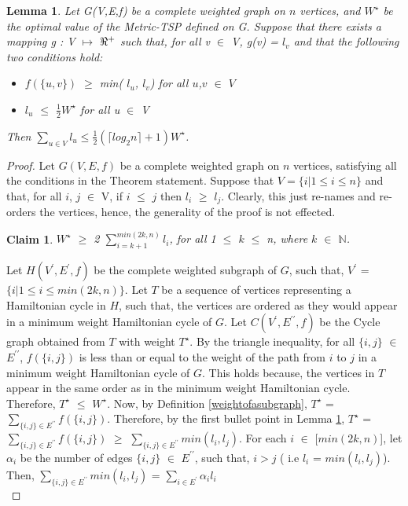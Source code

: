 \documentclass[12pt]{article}
\newtheorem{lemma}[definition]{Lemma}
\newtheorem{claim}{Claim}
\numberwithin{equation}{subsection}
\numberwithin{table}{subsection}
\numberwithin{algorithm}{subsection}
\numberwithin{figure}{subsection}
\begin{document}
\begin{lemma}
\label{to_proove_bound}
Let G(V,E,f) be a complete weighted graph on $n$ vertices, and $W^\star$ be the optimal value of the Metric-TSP defined on G. Suppose that there exists a mapping g : V $\mapsto$ $\real^+$ such that, for all v $\in$ V, g(v) = $l_v$ and that the following  two conditions hold:
\begin{itemize}
\item $f(\{u, v\})$ $\geq$ min( $l_u$, $l_v$) for all $u$,$v$ $\in$ $V$
\item $l_u$ $\leq$ $\frac{1}{2}W^\star$ for all u $\in$ V
\end{itemize}
Then $\sum_{u \in V} l_u \leq \frac{1}{2}(\lceil log_2 n \rceil + 1)W^\star$. {}
\end{lemma}
\begin{proof}
Let $G(V,E,f)$ be a complete weighted graph on $n$ vertices, satisfying all the conditions in the Theorem statement. Suppose that $V=\{i | 1 \leq i \leq n\}$ and that, for all $i$, $j$ $\in$ V, if $i$ $\leq$ $j$ then $l_i$ $\geq$ $l_j$. Clearly, this just re-names and re-orders the vertices, hence, the generality of the proof is not effected.
\begin{claim}
\label{claim1}
$W^\star$ $\geq$ 2 $\sum_{i = k+1}^{min(2k, n)} l_i$, for all 1 $\leq$ $k$ $\leq$ n, where $k$ $\in$ $\mathbb{N}$.
\end{claim}
Let $H(V^\prime,E^\prime,f)$ be the complete weighted subgraph of $G$, such that, $V^\prime$ = $\{i | 1 \leq i \leq min(2k, n)\}$. Let $T$ be a sequence of vertices representing a Hamiltonian cycle in $H$, such that, the vertices are ordered as they would appear in a minimum weight Hamiltonian cycle of $G$. Let $C(V^\prime, E^{\prime\prime}, f)$ be the Cycle graph obtained from $T$ with weight $T^\star$. By the triangle inequality, for all $\{i, j\}$ $\in$ $E^{\prime\prime}$, $f(\{i, j\})$ is less than or equal to the weight of the path from $i$ to $j$ in a minimum weight Hamiltonian cycle of $G$. This holds because, the vertices in $T$ appear in the same order as in the minimum weight Hamiltonian cycle. Therefore, $T^\star$ $\leq$ $W^\star$. Now, by Definition \ref{weightofasubgraph}, $T^\star$ =  $\sum_{\{i, j\} \in E^{\prime\prime}} f(\{i, j\})$. Therefore, by the first bullet point in Lemma \ref{to_proove_bound},  $T^\star$ = $\sum_{\{i, j\} \in E^{\prime\prime}} f(\{i, j\})$ $\geq$  $\sum_{\{i, j\} \in E^{\prime\prime}} min(l_i, l_j)$. For each $i$ $\in$ [$min(2k, n)$], let $\alpha_i$ be the number of edges $\{i, j\}$ $\in$ $E^{\prime\prime}$, such that, $i > j$ ( i.e $l_i$ = $min(l_i, l_j)$). Then, $\sum_{\{i, j\} \in E^{\prime\prime}} min(l_i, l_j)$ = $\sum_{i \in E^\prime} \alpha_il_i$\\

\end{proof}
\end{document}
